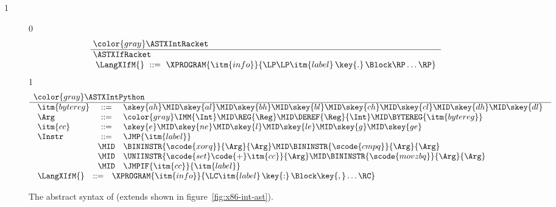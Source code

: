 \documentclass[7x10]{TimesAPriori_MIT}%
\newcommand{\gray}[1]{{\color{gray} #1}}
\def\racketEd{0}
\def\pythonEd{1}
\def\edition{1}
\def\riscvEd{1}
\def\architecture{1}
\newcommand{\pythonColor}[0]{}
\newcommand{\python}[1]{{\if\edition\pythonEd\pythonColor #1\fi}}
\numberwithin{theorem}{chapter}
\numberwithin{definition}{chapter}
\numberwithin{equation}{chapter}
\begin{document}
\newcommand{\ASTXIfPython}{
\begin{array}{lcl}
\itm{bytereg} &::=& \skey{ah} \MID \skey{al} \MID \skey{bh} \MID \skey{bl}
    \MID \skey{ch} \MID \skey{cl} \MID \skey{dh} \MID \skey{dl} \\
\Arg &::=&  \gray{\IMM{\Int} \MID \REG{\Reg} \MID \DEREF{\Reg}{\Int}} 
     \MID \BYTEREG{\itm{bytereg}} \\
\itm{cc} & ::= & \skey{e} \MID \skey{ne} \MID \skey{l} \MID \skey{le} \MID \skey{g} \MID \skey{ge} \\
\Instr &::=& \python{\JMP{\itm{label}}}\\
       &\MID& \BININSTR{\scode{xorq}}{\Arg}{\Arg}
       \MID \BININSTR{\scode{cmpq}}{\Arg}{\Arg}\\
       &\MID& \UNIINSTR{\scode{set}\code{+}\itm{cc}}{\Arg} 
       \MID \BININSTR{\scode{movzbq}}{\Arg}{\Arg}\\
       &\MID&  \JMPIF{\itm{cc}}{\itm{label}} 
\end{array}
}
\fi
\if\architecture\riscvEd
\newcommand{\ASTXIfPython}{
\begin{array}{lcl}
\itm{cc} & ::= & \skey{eq} \MID \skey{ne} \MID \skey{lt} \MID \skey{ge} \\
  \Instr &::=&
             \SETIF{\itm{cc}}{\Arg}{\Arg} \\
       &\MID& \python{\JMP{\itm{label}}} \MID  \JMPIF{\itm{cc}}{\Arg}{\Arg}{\itm{label}} 
\end{array}
}\fi


\begin{figure}[tp]
\begin{tcolorbox}[colback=white]
\small    
{\if\edition\racketEd    
\[\arraycolsep=3pt
\begin{array}{l}
  \gray{\ASTXIntRacket} \\ \hline
  \ASTXIfRacket \\
\begin{array}{lcl}
\LangXIfM{} &::= & \XPROGRAM{\itm{info}}{\LP\LP\itm{label} \,\key{.}\, \Block \RP\ldots\RP}
\end{array}
\end{array}
\]
\fi}
%
{\if\edition\pythonEd\pythonColor
\[
\begin{array}{l}
  \gray{\ASTXIntPython} \\ \hline
  \ASTXIfPython \\
\begin{array}{lcl}
\LangXIfM{} &::= & \XPROGRAM{\itm{info}}{\LC\itm{label} \,\key{:}\, \Block \key{,} \ldots \RC }
\end{array}
\end{array}
\]
\fi}
\end{tcolorbox}
\caption{The abstract syntax of \LangXIf{} (extends \LangXInt{} shown in figure~\ref{fig:x86-int-ast}).}
\label{fig:x86-1}
\end{figure}
\end{document}

